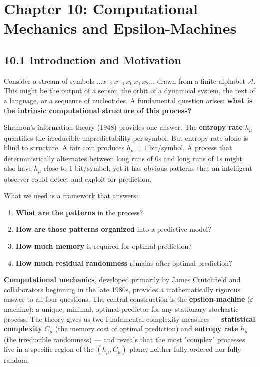 \chapter{Chapter 10: Computational Mechanics and Epsilon-Machines}

\section{10.1 Introduction and Motivation}

Consider a stream of symbols $\ldots x_{-2}\, x_{-1}\, x_0\, x_1\, x_2 \ldots$ drawn from a finite alphabet $\mathcal{A}$. This might be the output of a sensor, the orbit of a dynamical system, the text of a language, or a sequence of nucleotides. A fundamental question arises: \textbf{what is the intrinsic computational structure of this process?}

Shannon's information theory (1948) provides one answer. The \textbf{entropy rate} $h_\mu$ quantifies the irreducible unpredictability per symbol. But entropy rate alone is blind to structure. A fair coin produces $h_\mu = 1$ bit/symbol. A process that deterministically alternates between long runs of 0s and long runs of 1s might also have $h_\mu$ close to 1 bit/symbol, yet it has obvious patterns that an intelligent observer could detect and exploit for prediction.

What we need is a framework that answers:

\begin{enumerate}
  \item \textbf{What are the patterns} in the process?
  \item \textbf{How are those patterns organized} into a predictive model?
  \item \textbf{How much memory} is required for optimal prediction?
  \item \textbf{How much residual randomness} remains after optimal prediction?
\end{enumerate}

\textbf{Computational mechanics}, developed primarily by James Crutchfield and collaborators beginning in the late 1980s, provides a mathematically rigorous answer to all four questions. The central construction is the \textbf{epsilon-machine} ($\varepsilon$-machine): a unique, minimal, optimal predictor for any stationary stochastic process. The theory gives us two fundamental complexity measures --- \textbf{statistical complexity} $C_\mu$ (the memory cost of optimal prediction) and \textbf{entropy rate} $h_\mu$ (the irreducible randomness) --- and reveals that the most "complex" processes live in a specific region of the $(h_\mu, C_\mu)$ plane, neither fully ordered nor fully random.

